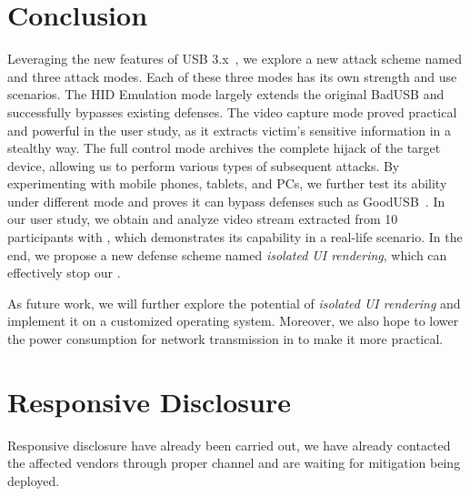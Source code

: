 \section{Conclusion}
\label{sec:conclusion}

Leveraging the new features of USB 3.x~\cite{usb31,usb31,usb32}, we explore a
new attack scheme named \tool and three attack modes. Each of these three modes
has its own strength and use scenarios. The HID Emulation mode largely extends the
original BadUSB and successfully bypasses existing defenses. The video capture mode proved practical and powerful in the user study, as it extracts
victim's sensitive information in a stealthy way. The full control mode
archives the complete hijack of the target device, allowing us to perform various
types of subsequent attacks. By experimenting \tool with mobile phones, tablets,
and PCs, we further test its ability under different mode and proves it can
bypass defenses such as GoodUSB~\cite{tian2015defending}. In our user study, we
obtain and analyze video stream extracted from 10 participants with \tool,
which demonstrates its capability in a real-life scenario. In the end, we
propose a new defense scheme named \textit{isolated UI rendering}, which can
effectively stop our \tool.

As future work, we will further explore the potential of \textit{isolated UI
rendering} and implement it on a customized operating system. Moreover, we also
hope to lower the power consumption for network transmission in \tool to make
it more practical.

\section{Responsive Disclosure}

Responsive disclosure have already been carried out, we have already contacted the affected vendors through proper channel and are waiting for mitigation being deployed.